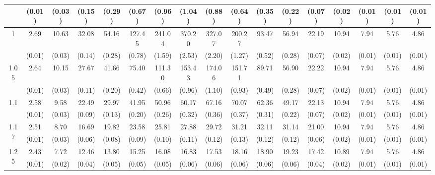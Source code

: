 \documentclass[12pt]{article}  %
\theoremstyle{plain}
\begin{document}
\begin{sidewaystable}[htbp]
\begin{tabular}{ccccccccccccccccc}
                      & (0.01)& (0.03)& (0.15)& (0.29)& (0.67)& (0.96)& (1.04)& (0.88)& (0.64)&  (0.35)&  (0.22)&  (0.07)&  (0.02)&  (0.01)&  (0.01)&(0.01)\\ \hline
\multirow{2}{*}{1}  & 2.69 &10.63& 32.08& 54.16 &127.45 &241.04 &370.20 &327.07 &200.27 &93.47& 56.94& 22.19& 10.94& 7.94 & 5.76  &4.86\\
                      & (0.01)& (0.03)& (0.14)& (0.28)& (0.78)& (1.59)& (2.53)& (2.20)& (1.27)&  (0.52)&  (0.28)&  (0.07)&  (0.02)&  (0.01)&  (0.01)&(0.01)\\ \hline                                                                     
\multirow{2}{*}{1.05}  &2.64 &10.15 &27.67 &41.66 & 75.40 &111.30& 153.43 &174.06 &151.71& 89.71& 56.90& 22.22 &10.94& 7.94 & 5.76 & 4.86\\
                      & (0.01)& (0.03)& (0.11)& (0.20)& (0.42)& (0.66)& (0.96)& (1.10)& (0.93)&  (0.49)&  (0.28)&  (0.07)&  (0.02)&  (0.01)&  (0.01)&(0.01)\\ \hline                                                                                                                                          
\multirow{2}{*}{1.1}  &2.58 & 9.58& 22.49 &29.97 & 41.95 & 50.96 & 60.17 & 67.16 & 70.07& 62.36 &49.17 &22.13& 10.94&7.94 & 5.76 & 4.86\\
                      &  (0.01) &(0.03)& (0.09)& (0.13)& (0.20)& (0.26)& (0.32)& (0.36)& (0.37)&  (0.31)&  (0.22)&  (0.07)&  (0.02)&  (0.01)&  (0.01)&(0.01)\\ \hline
\multirow{2}{*}{1.17}  &2.51  &8.70 &16.69& 19.82 & 23.58 & 25.81 & 27.88 & 29.72 & 31.21& 32.11& 31.14& 21.00& 10.94&7.94 & 5.76 & 4.86\\
                      &  (0.01)& (0.03)& (0.06)& (0.08)& (0.09)& (0.10)& (0.11)& (0.12)& (0.13)&  (0.12)&  (0.12)&  (0.06)&  (0.02)&  (0.01)  &(0.01)&(0.01)\\ \hline                                                                                                                                                                                                                                                                                    
                                                                     \multirow{2}{*}{1.25}  &2.43 & 7.72 &12.46 &13.80 & 15.25 & 16.08 & 16.83 & 17.53 & 18.16 &18.90 &19.23& 17.42 &10.89 & 7.94& 5.76 & 4.86\\
                      &  (0.01)& (0.02)& (0.04)& (0.05)& (0.05)& (0.05)& (0.06)& (0.06)& (0.06)&  (0.06)&  (0.06)&  (0.04)&  (0.02)&  (0.01)&  (0.01) &(0.01)\\ \hline                                                                                                                                                                                                                                                                                    

\end{tabular}
\end{sidewaystable}
\end{document}
